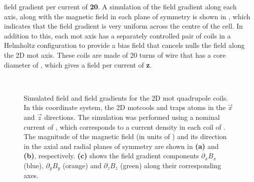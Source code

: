 field gradient per current of {\textbf
{20}}\;\sivalue{}{\gauss\per\centi\metre\per\ampere}. A simulation of the
field gradient along each axis, along with the magnetic field in each plane
of symmetry is shown in , which
indicates that the field gradient is very uniform across the centre of the
cell. In addition to this, each \ac{mot} axis has a separately controlled
pair of coils in a Helmholtz configuration to provide a bias field that
cancels nulls the field along the 2D \ac{mot} axis. These coils are made of
20 turns of wire that has a core diameter of , which
gives a field per current of {\textbf{z}}\;\sivalue{}{\gauss\per\ampere}.
\begin{figure}
    \centering
    \def\svgwidth{\columnwidth}
    \\
    \caption[Simulated field and field gradients for the 2D \ac{mot} quadrupole
coils]{Simulated field and field gradients for the 2D \ac{mot} quadrupole
coils. In
this coordinate system, the 2D \ac{mot}cools and traps atoms in the
\(\vec{x}\) and \(\vec{z}\) directions. The simulation was performed using a
nominal current of , which corresponds to a current
density in each coil of . The
magnitude of the magnetic field (in units of \sivalue{}{\gauss}) and its
direction in the axial and radial planes of symmetry are shown in
\textbf{(a)} and \textbf{(b)}, respectively. \textbf{(c)} shows the field
gradient components \(\partial_x B_x\) (blue), \(\partial_y B_y\) (orange)
and \(\partial_z B_z\) (green) along their corresponding axes.}
    \label{fig:2d_mot_field_gradient}
\end{figure}
